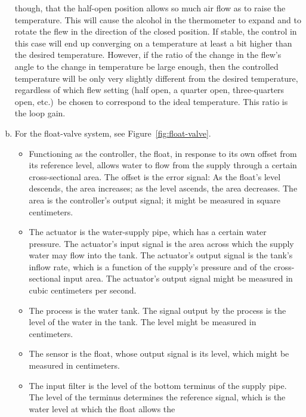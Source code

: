 \begin{enumerate}[(a)]
      though, that the half-open position allows so much air flow as to raise
      the temperature. This will cause the alcohol in the thermometer to expand
      and to rotate the flew in the direction of the closed position. If
      stable, the control in this case will end up converging on a temperature
      at least a bit higher than the desired temperature. However, if the ratio
      of the change in the flew's angle to the change in temperature be large
      enough, then the controlled temperature will be only very slightly
      different from the desired temperature, regardless of which flew setting
      (half open, a quarter open, three-quarters open, etc.)~be chosen to
      correspond to the ideal temperature. This ratio is the loop gain.
   \item For the float-valve system, see Figure~\ref{fig:float-valve}.
      \begin{itemize}
         \item Functioning as the controller, the float, in response to its own
            offset from its reference level, allows water to flow from the
            supply through a certain cross-sectional area.  The offset is the
            error signal: As the float's level descends, the area increases; as
            the level ascends, the area decreases. The area is the controller's
            output signal; it might be measured in square centimeters.
         \item The actuator is the water-supply pipe, which has a certain water
            pressure. The actuator's input signal is the area across which the
            supply water may flow into the tank.  The actuator's output signal
            is the tank's inflow rate, which is a function of the supply's
            pressure and of the cross-sectional input area.  The actuator's
            output signal might be measured in cubic centimeters per second.
         \item The process is the water tank. The signal output by the process
            is the level of the water in the tank. The level might be measured
            in centimeters.
         \item The sensor is the float, whose output signal is its level, which
            might be measured in centimeters.
         \item The input filter is the level of the bottom terminus of the
            supply pipe. The level of the terminus determines the reference
            signal, which is the water level at which the float allows the

\end{itemize}
\end{enumerate}
